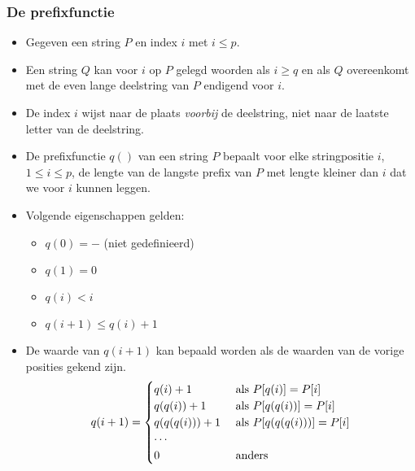 \subsubsection{De prefixfunctie}
\begin{itemize}
    \item Gegeven een string $P$ en index $i$ met $i \leq p$.
    \item Een string $Q$ kan voor $i$ op $P$ gelegd woorden als $i \geq q$ en als $Q$ overeenkomt met de even lange deelstring van $P$ endigend voor $i$.
    \item De index $i$ wijst naar de plaats \textit{voorbij} de deelstring, niet naar de laatste letter van de deelstring.
    \item De prefixfunctie $q()$ van een string $P$ bepaalt voor elke stringpositie $i$, $1 \leq i \leq p$, de lengte van de langste prefix van $P$ met lengte kleiner dan $i$ dat we voor $i$ kunnen leggen.

    \item Volgende eigenschappen gelden:
    \begin{itemize}
        \item $q(0) = -$ (niet gedefinieerd)
        \item $q(1) = 0$
        \item $q(i) < i$
        \item $q(i + 1) \leq q(i) + 1$
    \end{itemize}
    \item De waarde van $q(i + 1)$ kan bepaald worden als de waarden van de vorige posities gekend zijn.
    $$q(i + 1) = \begin{cases}
        q(i) + 1 & \hbox{ als } P[q(i)] = P[i]  \\
        q(q(i)) + 1 & \hbox{ als } P[q(q(i))] = P[i] \\
        q(q(q(i))) + 1 & \hbox{ als } P[q(q(q(i)))] = P[i] \\
        \cdots \\
        0 & \hbox { anders }
    \end{cases}$$


\end{itemize}
